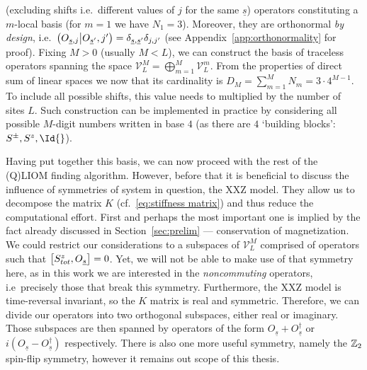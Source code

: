 (excluding shifts i.e.\ different values of \(j\) for the same \(\underline{s}\)) operators
constituting a \(m\)-local basis (for \(m = 1\) we have \(N_1 = 3\)). Moreover, they are orthonormal
\textit{by design}, i.e.\ \(\left(O_{\underline{s},j} \middle| O_{\underline{s}^{\prime}},j^{\prime}\right) =
\delta_{\underline{s},\underline{s}^{\prime}}\delta_{j,j^{\prime}}\) (see Appendix~\ref{app:orthonormality} for proof).
Fixing \(M>0\) (usually \(M<L\)), we can construct the basis of traceless operators spanning
the space \(\mathcal{V}_L^M = \bigoplus_{m=1}^{M} \mathcal{V}_L^m\). From the properties of 
direct sum of linear spaces we now that its cardinality is \(D_M = \sum_{m=1}^{M} N_m = 
 3 \cdot 4^{M-1}\). To include all possible shifts, this value needs to multiplied by
 the number of sites \(L\). Such construction can be implemented in practice by considering
 all possible \(M\)-digit numbers written in base \(4\) (as there are \(4\) `building blocks':
  \(S^{\pm},S^{z},\Id{}\)). 

Having put together this basis, we can now proceed with the rest of the (Q)LIOM finding algorithm.
However, before that it is beneficial to discuss the influence of symmetries of system in question,
the XXZ model. They allow us to decompose the matrix \(K\) 
(cf.~\eqref{eq:stiffness matrix}) and thus reduce the computational effort. First and perhaps
the most important one is implied by the fact already discussed in Section~\ref{sec:prelim} ---
conservation of magnetization. We could restrict our considerations to a subspaces
of \(\mathcal{V}_L^M\) comprised of operators such that \(\comm{S_{tot}^z}{O_{\underline{s}}} = 0\).
Yet, we will not be able to make use of that symmetry here, as in this work we are interested 
in the \textit{noncommuting} operators, i.e\ precisely those that break this symmetry.
Furthermore, the XXZ model is time-reversal invariant, so the \(K\) matrix is real and symmetric.
Therefore, we can divide our operators into two orthogonal subspaces, either real or imaginary.
Those subspaces are then spanned by operators of the form 
\(O_{\underline{s}}+O^{\dagger}_{\underline{s}}\) or 
\(i(O_{\underline{s}}-O^{\dagger}_{\underline{s}})\) respectively. There is also one more
useful symmetry, namely the \(\mathbb{Z}_2\) spin-flip symmetry, however it remains out scope of
this thesis. 


